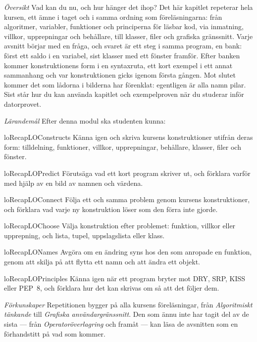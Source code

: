 \emph{Översikt}
Vad kan du nu, och hur hänger det ihop?  Det här kapitlet repeterar hela
kursen, ett ämne i taget och i samma ordning som föreläsningarna: från
algoritmer, variabler, funktioner och principerna för läsbar kod, via
inmatning, villkor,
upprepningar och behållare, till klasser, filer och grafiska
gränssnitt.  Varje avsnitt börjar med en fråga, och svaret är ett steg i
samma program, en bank: först ett saldo i en variabel, sist klasser med
ett fönster framför.  Efter banken kommer konstruktionens form i en
syntaxruta, ett kort exempel i ett annat sammanhang och var
konstruktionen gicks igenom första gången.  Mot slutet kommer det som
lådorna i bilderna har förenklat: egentligen är alla namn pilar.  Sist
står hur du kan använda kapitlet och exempelproven när du studerar inför
datorprovet.

\emph{Lärandemål}
Efter denna modul ska studenten kunna:
\begin{restatable}{lo}{RecapLOConstructs}\label{RecapLOConstructs}%
  Känna igen och skriva kursens konstruktioner utifrån deras form:
  tilldelning, funktioner, villkor, upprepningar, behållare, klasser,
  filer och fönster.
\end{restatable}
\begin{restatable}{lo}{RecapLOPredict}\label{RecapLOPredict}%
  Förutsäga vad ett kort program skriver ut, och förklara varför med
  hjälp av en bild av namnen och värdena.
\end{restatable}
\begin{restatable}{lo}{RecapLOConnect}\label{RecapLOConnect}%
  Följa ett och samma problem genom kursens konstruktioner, och förklara
  vad varje ny konstruktion löser som den förra inte gjorde.
\end{restatable}
\begin{restatable}{lo}{RecapLOChoose}\label{RecapLOChoose}%
  Välja konstruktion efter problemet: funktion, villkor eller upprepning,
  och lista, tupel, uppslagslista eller klass.
\end{restatable}
\begin{restatable}{lo}{RecapLONames}\label{RecapLONames}%
  Avgöra om en ändring syns hos den som anropade en funktion, genom att
  skilja på att flytta ett namn och att ändra ett objekt.
\end{restatable}
\begin{restatable}{lo}{RecapLOPrinciples}\label{RecapLOPrinciples}%
  Känna igen när ett program bryter mot DRY, SRP, KISS eller PEP~8, och
  förklara hur det kan skrivas om så att det följer dem.
\end{restatable}

\emph{Förkunskaper}
Repetitionen bygger på alla kursens föreläsningar, från
\emph{Algoritmiskt tänkande} till \emph{Grafiska användargränssnitt}.  Den
som ännu inte har tagit del av de sista --- från
\emph{Operatoröverlagring} och framåt --- kan läsa de avsnitten som en
förhandstitt på vad som kommer.
